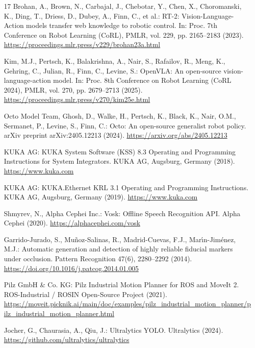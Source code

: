 \documentclass{svproc}
\begin{document}
\begin{thebibliography}{17}
Brohan, A., Brown, N., Carbajal, J., Chebotar, Y., Chen, X., Choromanski, K., Ding, T., Driess, D., Dubey, A., Finn, C., et al.: RT-2: Vision-Language-Action models transfer web knowledge to robotic control. In: Proc. 7th Conference on Robot Learning (CoRL), PMLR, vol. 229, pp. 2165--2183 (2023). \url{https://proceedings.mlr.press/v229/brohan23a.html}

Kim, M.J., Pertsch, K., Balakrishna, A., Nair, S., Rafailov, R., Meng, K., Gehring, C., Julian, R., Finn, C., Levine, S.: OpenVLA: An open-source vision-language-action model. In: Proc. 8th Conference on Robot Learning (CoRL 2024), PMLR, vol. 270, pp. 2679--2713 (2025). \url{https://proceedings.mlr.press/v270/kim25e.html}

Octo Model Team, Ghosh, D., Walke, H., Pertsch, K., Black, K., Nair, O.M., Sermanet, P., Levine, S., Finn, C.: Octo: An open-source generalist robot policy. arXiv preprint arXiv:2405.12213 (2024). \url{https://arxiv.org/abs/2405.12213}

KUKA AG: KUKA System Software (KSS) 8.3 Operating and Programming Instructions for System Integrators. KUKA AG, Augsburg, Germany (2018). \url{https://www.kuka.com}

KUKA AG: KUKA.Ethernet KRL 3.1 Operating and Programming Instructions. KUKA AG, Augsburg, Germany (2019). \url{https://www.kuka.com}

Shmyrev, N., Alpha Cephei Inc.: Vosk: Offline Speech Recognition API. Alpha Cephei (2020). \url{https://alphacephei.com/vosk}

Garrido-Jurado, S., Mu{\~n}oz-Salinas, R., Madrid-Cuevas, F.J., Mar{\'\i}n-Jim{\'e}nez, M.J.: Automatic generation and detection of highly reliable fiducial markers under occlusion. Pattern Recognition 47(6), 2280--2292 (2014). \url{https://doi.org/10.1016/j.patcog.2014.01.005}

Pilz GmbH \& Co. KG: Pilz Industrial Motion Planner for ROS and MoveIt 2. ROS-Industrial / ROSIN Open-Source Project (2021). \url{https://moveit.picknik.ai/main/doc/examples/pilz_industrial_motion_planner/pilz_industrial_motion_planner.html}

Jocher, G., Chaurasia, A., Qiu, J.: Ultralytics YOLO. Ultralytics (2024). \url{https://github.com/ultralytics/ultralytics}

\end{thebibliography}
\end{document}
